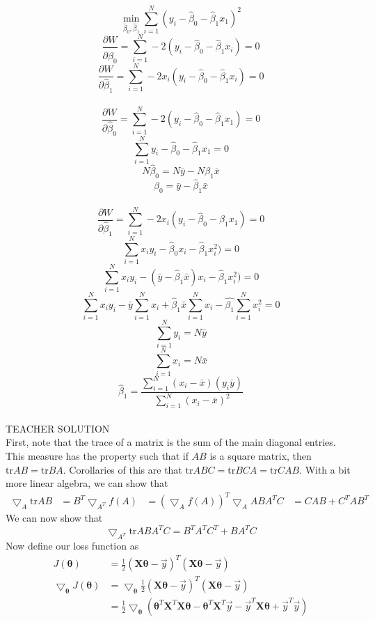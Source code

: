 \documentclass[draft]{exam} %
\theoremstyle{definition} \newtheorem*{defn}{Definition}
\begin{document}
\begin{questions}
\begin{solution}
$$\min_{\hat{\beta}_0,\hat{\beta}_1}\sum_{i=1}^N (y_i - \hat{\beta}_0 - \hat{\beta}_1 x_1)^2$$
$$\frac{\partial W}{\partial \hat{\beta}_0} = \sum_{i=1}^N -2(y_i - \hat{\beta}_0 -\hat{\beta}_1 x_i) = 0$$
$$\frac{\partial W}{\partial \hat{\beta}_1} = \sum_{i=1}^N -2x_i(y_i - \hat{\beta}_0 -\hat{\beta}_1 x_i) = 0$$
\\
$$\frac{\partial W}{\partial \hat{\beta}_0} = \sum_{i=1}^N -2(y_i - \hat{\beta}_0 -\hat{\beta}_1 x_1) = 0$$
$$\sum_{i=1}^N y_i - \hat{\beta}_0 -\hat{\beta}_1 x_1 = 0$$
$$N \hat{\beta}_0 = N \bar{y} - N \hat{\beta_1} \bar{x}$$
$$\hat{\beta}_0 = \bar{y} - \hat{\beta}_1 \bar{x}$$
\\
$$\frac{\partial W}{\partial \hat{\beta}_1} = \sum_{i=1}^N -2x_i(y_i - \hat{\beta}_0 -\hat{\beta}_1 x_1) = 0$$
$$ \sum_{i=1}^N x_i y_i - \hat{\beta}_0 x_i -\hat{\beta}_1 x_i^2) = 0$$
$$ \sum_{i=1}^N x_i y_i - (\bar{y} - \hat{\beta}_1 \bar{x}) x_i -\hat{\beta}_1 x_i^2) = 0$$
$$\sum_{i=1}^N x_i y_i - \bar{y}\sum_{i=1}^N x_i + \hat{\beta}_1 \bar{x} \sum_{i=1}^N x_i - \hat{\beta_1}\sum_{i=1}^N x_i^2 = 0$$
$$\sum_{i=1}^N y_i = N \bar{y}$$
$$\sum_{i=1}^N x_i = N \bar{x}$$
$$\hat{\beta}_1 = \frac{\sum_{i=1}^N (x_i-\bar{x})(y_i \bar{y})}{\sum_{i=1}^N (x_i - \bar{x})^2}$$
\\
TEACHER SOLUTION\\
First, note that the trace of a matrix is the sum of the main diagonal
entries. This measure has the property such that if $AB$ is a square matrix,
then $\text{tr}AB=\text{tr}BA$. Corollaries of this are that
$\text{tr}ABC=\text{tr}BCA= \text{tr}CAB$. With a bit more linear algebra,
we can show that
\begin{align}
\bigtriangledown_{A} \text{tr}AB &= B^T
\bigtriangledown_{A^T} f(A) &= (\bigtriangledown_{A} f(A))^T 
\bigtriangledown_{A} ABA^TC &= CAB + C^TAB^T
\end{align}
We can now show that 
\[ \bigtriangledown_{A^T} \text{tr} ABA^TC = B^TA^TC^T + BA^TC \]
Now define our loss function as
\begin{align}
 J(\pmb{\theta}) &= \frac{1}{2} (\pmb{X \theta} -
\vec{y})^T (\pmb{X\theta} - \vec{y})\\
\bigtriangledown_{\pmb{\theta}} J(\pmb{\theta}) &= 
\bigtriangledown_{\pmb{\theta}} \frac{1}{2} (\pmb{X \theta} -
\vec{y})^T (\pmb{X\theta} - \vec{y})\\
&= \frac{1}{2}\bigtriangledown_{\pmb{\theta}}
(\pmb{\theta}^T\pmb{X}^T\pmb{X}\pmb{\theta} -
\pmb{\theta}^T\pmb{X}^T \vec{y} -
\vec{y}^T \pmb{X}\pmb{\theta} +
\vec{y}^T \vec{y})\\

\end{align}
\end{solution}
\end{questions}
\end{document}
